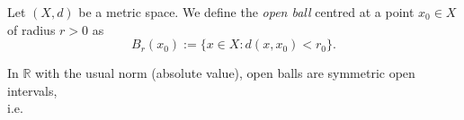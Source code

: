 \documentclass [aspectratio=169]{beamer}
\newcommand{\R}{{\mathbb{R}}}
\begin{document}
\begin{frame}
\begin{definition}
Let $(X,d)$ be a metric space. We define the \emph{open ball} centred at a point $x_0 \in X$ of radius $r > 0$ as
\begin{equation*}
    B_r(x_0) := \{x \in X : d(x,x_0) < r_0 \}.
\end{equation*}
\end{definition}

\vspace{1cm}

\begin{example}
In $\R$ with the usual norm (absolute value), open balls are symmetric open intervals, \\
i.e. 
\vspace{1em}
\end{example}
\end{frame}
\end{document}
